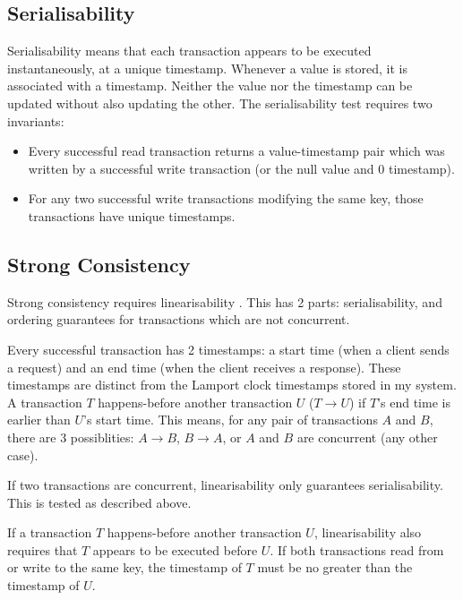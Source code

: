 \documentclass[12pt,a4paper,twoside,openany]{report}
\begin{document}
\subsection{Serialisability}

Serialisability means that each transaction appears to be executed instantaneously, at a unique timestamp. Whenever a value is stored, it is associated with a timestamp. Neither the value nor the timestamp can be updated without also updating the other. The serialisability test requires two invariants:

\begin{itemize}
  \item
  Every successful read transaction returns a value-timestamp pair which was written by a successful write transaction (or the null value and 0 timestamp).

  \item
  For any two successful write transactions modifying the same key, those transactions have unique timestamps.

\end{itemize}

\subsection{Strong Consistency}

Strong consistency requires linearisability \cite{herlihy1990linearizability}. This has 2 parts: serialisability, and ordering guarantees for transactions which are not concurrent.

Every successful transaction has 2 timestamps: a start time (when a client sends a request) and an end time (when the client receives a response). These timestamps are distinct from the Lamport clock timestamps stored in my system. A transaction $T$ happens-before another transaction $U$ ($T \rightarrow U$) if $T$'s end time is earlier than $U$'s start time. This means, for any pair of transactions $A$ and $B$, there are 3 possiblities: $A \rightarrow B$, $B \rightarrow A$, or $A$ and $B$ are concurrent (any other case).

If two transactions are concurrent, linearisability only guarantees serialisability. This is tested as described above.

If a transaction $T$ happens-before another transaction $U$, linearisability also requires that $T$ appears to be executed before $U$. If both transactions read from or write to the same key, the timestamp of $T$ must be no greater than the timestamp of $U$.
\end{document}
